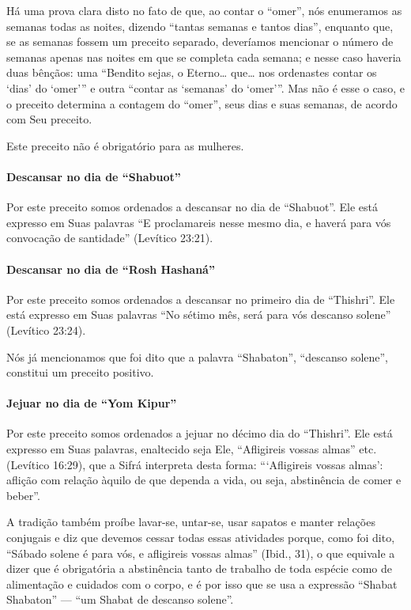 Há uma prova clara disto no fato de que, ao contar o ``omer'', nós
enumeramos as semanas todas as noites, dizendo ``tantas semanas e tantos
dias'', enquanto que, se as semanas fossem um preceito separado,
deveríamos mencionar o número de semanas apenas nas noites em que se
completa cada semana; e nesse caso haveria duas bênçãos: uma ``Bendito
sejas, o Eterno\ldots{} que\ldots{} nos ordenastes contar os `dias' do `omer'''
e outra ``contar as `semanas' do `omer'''. Mas não é esse o caso, e o
preceito determina a contagem do ``omer'', seus dias e suas semanas, de
acordo com Seu preceito.

Este preceito não é obrigatório para as mulheres.

\paragraph{Descansar no dia de ``Shabuot''}

Por este preceito somos ordenados a descansar no dia de ``Shabuot''. Ele
está expresso em Suas palavras ``E proclamareis nesse mesmo dia, e
haverá para vós convocação de santidade'' (Levítico 23:21).

\paragraph{Descansar no dia de ``Rosh Hashaná''}

Por este preceito somos ordenados a descansar no primeiro dia de
``Thishri''. Ele está expresso em Suas palavras ``No sétimo mês, será
para vós descanso solene'' (Levítico 23:24).

Nós já mencionamos que foi dito que a palavra ``Shabaton'', ``descanso
solene'', constitui um preceito positivo.

\paragraph{Jejuar no dia de ``Yom Kipur''}

Por este preceito somos ordenados a jejuar no décimo dia do
``Thishri''. Ele está expresso em Suas palavras, enaltecido seja Ele,
``Afligireis vossas almas'' etc. (Levítico 16:29), que a Sifrá
interpreta desta forma: ```Afligireis vossas almas': aflição com relação àquilo de que dependa a vida, ou seja, abstinência de comer e beber''.

A tradição também proíbe lavar-se, untar-se, usar sapatos e manter
relações conjugais e diz que devemos cessar todas essas atividades
porque, como foi dito, ``Sábado solene é para vós, e afligireis vossas
almas'' (Ibid., 31), o que equivale a dizer que é obrigatória a
abstinência tanto de trabalho de toda espécie como de alimentação e
cuidados com o corpo, e é por isso que se usa a expressão ``Shabat
Shabaton'' --- ``um Shabat de descanso solene''.

